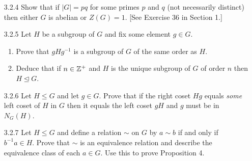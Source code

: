 \begin{enumerate}
      \textbf{Proof.} Let $H$ be a nontrivial proper subgroup of $Q_8$. By
      Langrange's Theorem, $|H| = 2$ or $|H| = 4$. Since $-1$ is the only
      element of order 2 in $Q_8$, it follows that if $|H| = 2$, then $H$ must
      be the subgroup $\cyc{-1}$. Now suppose $|H| = 4$. Let
      $x \in S = \{i, j, k\}$. Then $x \in H$ or $-x \in H$ if and only if
      $H = \cyc{x} = \cyc{-x}$. Thus $H \in \{\cyc{i}, \cyc{j}, \cyc{k}\}$. So
      the intersection of any two subgroups of order 4 in $Q_8$ is $\cyc{-1}$.
      Observe that any subgroup that contains two elements of $S$ must generate 
      $Q_8$ because $Q_8 = \cyc{i, j} = \cyc{j, k} = \cyc{i, k}$. Thus the join
      of any two subgroups of order 4 in $Q_8$ is $Q_8$. Conclude that the 
      lattice of $Q_8$ is correct. \qed
   \item[3.2.4]   Show that if $|G| = pq$ for some primes $p$ and $q$ (not
                  necessarily distinct) then either $G$ is abelian or
                  $Z(G) = 1$. [See Exercise 36 in Section 1.]
   \item[3.2.5]   Let $H$ be a subgroup of $G$ and fix some element $g \in G$.
                  \begin{enumerate}
                     \item Prove that $gHg^{-1}$ is a subgroup of $G$ of the
                           same order as $H$.
                     \item Deduce that if $n \in \mathbb{Z}^+$ and $H$ is the unique
                           subgroup of $G$ of order $n$ then
                           $H \trianglelefteq G$.
                  \end{enumerate}
   \item[3.2.6]   Let $H \le G$ and let $g \in G$. Prove that if the right coset
                  $Hg$ equals \textit{some} left coset of $H$ in $G$ then it
                  equals the left coset $gH$ and $g$ must be in $N_G(H)$.
   \item[3.2.7]   Let $H \le G$ and define a relation $\sim$ on $G$ by
                  $a \sim b$ if and only if $b^{-1}a \in H$. Prove that $\sim$
                  is an equivalence relation and describe the equivalence class
                  of each $a \in G$. Use this to prove Proposition 4.

\end{enumerate}
